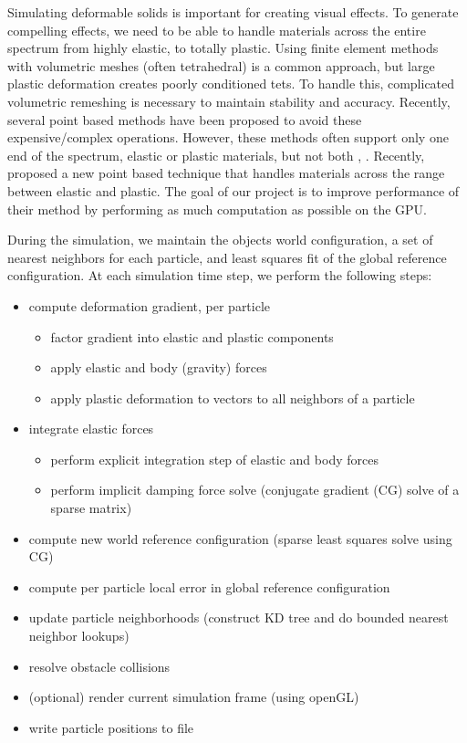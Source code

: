 \documentclass[cameraready]{acmsiggraph-awb}
\begin{document}
Simulating deformable solids is important for creating visual effects.  To generate compelling effects, we need to be able to handle materials across the entire spectrum from highly elastic, to totally plastic.  Using finite element methods with volumetric meshes (often tetrahedral) is a common approach, but large plastic deformation creates poorly conditioned tets.  To handle this, complicated volumetric remeshing is necessary to maintain stability and accuracy.  Recently, several point based methods have been proposed to avoid these expensive/complex operations.  However, these methods often support only one end of the spectrum, elastic or plastic materials, but not both  \cite{meuller}, \cite{dan}.  Recently, \cite{us} proposed a new point based technique that handles materials across the range between elastic and plastic.  The goal of our project is to improve performance of their method by performing as much computation as possible on the GPU.  

During the simulation, we maintain the objects world configuration, a set of nearest neighbors for each particle, and least squares fit of the global reference configuration.  At each simulation time step, we perform the following steps:
\newpage
\begin{itemize}

\item compute deformation gradient, per particle
\begin{itemize}
\item factor gradient into elastic and plastic components
\item apply elastic and body (gravity) forces
\item apply plastic deformation to vectors to all neighbors of a particle
\end{itemize}
\item integrate elastic forces
\begin{itemize}
\item perform explicit integration step of elastic and body forces
\item perform implicit damping force solve (conjugate gradient (CG) solve of a sparse matrix)
\end{itemize}
\item compute new world reference configuration (sparse least squares solve using CG)
\item compute per particle local error in global reference configuration 
\item update particle neighborhoods (construct KD tree and do bounded nearest neighbor lookups)
\item resolve obstacle collisions
\item (optional) render current simulation frame (using openGL)
\item write particle positions to file
\end{itemize}
\end{document}
